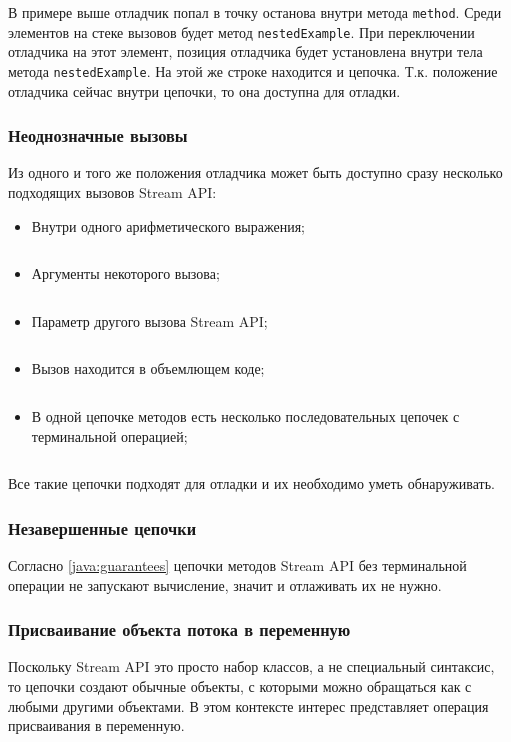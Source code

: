 В примере выше отладчик попал в точку останова внутри метода \texttt{method}. Среди элементов на стеке вызовов будет метод \texttt{nestedExample}. При переключении отладчика на этот элемент, позиция отладчика будет установлена внутри тела метода \texttt{nestedExample}. На этой же строке находится и цепочка. Т.к. положение отладчика сейчас внутри цепочки, то она доступна для отладки.

\subsubsection{Неоднозначные вызовы}
Из одного и того же положения отладчика может быть доступно сразу несколько подходящих вызовов Stream API:
\begin{itemize}
	\item Внутри одного арифметического выражения;
	\inputminted{java}{chapter2/code/AmbiguousPlus.java}
	\item Аргументы некоторого вызова;
	\inputminted{java}{chapter2/code/AmbiguousArgs.java}
	\item Параметр другого вызова Stream API;
	\inputminted{java}{chapter2/code/AmbiguousNested.java}
	\item Вызов находится в объемлющем коде;
	\inputminted{java}{chapter2/code/AmbiguousLambda.java}
	\item В одной цепочке методов есть несколько последовательных цепочек с терминальной операцией;
	\inputminted{java}{chapter2/code/AmbiguousLinkedChains.java}
\end{itemize}
Все такие цепочки подходят для отладки и их необходимо уметь обнаруживать.

\subsubsection{Незавершенные цепочки}\label{java:incomplete}
Согласно \ref{java:guarantees} цепочки методов Stream API без терминальной операции не запускают вычисление, значит и отлаживать их не нужно.

\subsubsection{Присваивание объекта потока в переменную}
Поскольку Stream API это просто набор классов, а не специальный синтаксис, то цепочки создают обычные объекты, с которыми можно обращаться как с любыми другими объектами. В этом контексте интерес представляет операция присваивания в переменную.
\inputminted{java}{chapter2/code/AssignToVariable.java}

